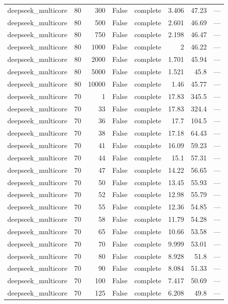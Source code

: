 \begin{tabular}{lrrrlrrl}
deepseek\_multicore & 80 & 300 & False & complete & 3.406 & 47.23 & — \\
deepseek\_multicore & 80 & 500 & False & complete & 2.601 & 46.69 & — \\
deepseek\_multicore & 80 & 750 & False & complete & 2.198 & 46.47 & — \\
deepseek\_multicore & 80 & 1000 & False & complete & 2 & 46.22 & — \\
deepseek\_multicore & 80 & 2000 & False & complete & 1.701 & 45.94 & — \\
deepseek\_multicore & 80 & 5000 & False & complete & 1.521 & 45.8 & — \\
deepseek\_multicore & 80 & 10000 & False & complete & 1.46 & 45.77 & — \\
deepseek\_multicore & 70 & 1 & False & complete & 17.83 & 345.5 & — \\
deepseek\_multicore & 70 & 33 & False & complete & 17.83 & 324.4 & — \\
deepseek\_multicore & 70 & 36 & False & complete & 17.7 & 104.5 & — \\
deepseek\_multicore & 70 & 38 & False & complete & 17.18 & 64.43 & — \\
deepseek\_multicore & 70 & 41 & False & complete & 16.09 & 59.23 & — \\
deepseek\_multicore & 70 & 44 & False & complete & 15.1 & 57.31 & — \\
deepseek\_multicore & 70 & 47 & False & complete & 14.22 & 56.65 & — \\
deepseek\_multicore & 70 & 50 & False & complete & 13.45 & 55.93 & — \\
deepseek\_multicore & 70 & 52 & False & complete & 12.98 & 55.79 & — \\
deepseek\_multicore & 70 & 55 & False & complete & 12.36 & 54.85 & — \\
deepseek\_multicore & 70 & 58 & False & complete & 11.79 & 54.28 & — \\
deepseek\_multicore & 70 & 65 & False & complete & 10.66 & 53.58 & — \\
deepseek\_multicore & 70 & 70 & False & complete & 9.999 & 53.01 & — \\
deepseek\_multicore & 70 & 80 & False & complete & 8.928 & 51.8 & — \\
deepseek\_multicore & 70 & 90 & False & complete & 8.084 & 51.33 & — \\
deepseek\_multicore & 70 & 100 & False & complete & 7.417 & 50.69 & — \\
deepseek\_multicore & 70 & 125 & False & complete & 6.208 & 49.8 & — \\

\end{tabular}
